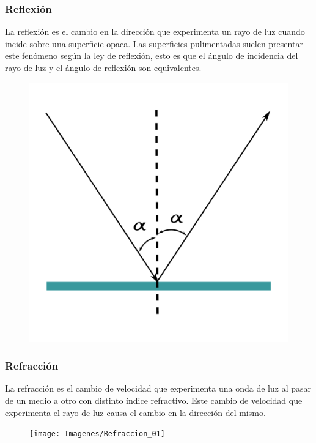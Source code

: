\documentclass[10pt,a4paper]{article}
\begin{document}
\subsubsection{Reflexión}
La reflexión es el cambio en la dirección que experimenta un rayo de luz cuando incide sobre una superficie opaca. Las superficies pulimentadas suelen presentar este fenómeno según la ley de reflexión, esto es que el ángulo de incidencia del rayo de luz y el ángulo de reflexión son equivalentes.
\begin{figure}[H]
\centering
\includegraphics[scale=0.18]{Imagenes/Reflexion_01}
\end{figure}

\subsubsection{Refracción}
La refracción es el cambio de velocidad que experimenta una onda de luz al pasar de un medio a otro con distinto índice refractivo. Este cambio de velocidad que experimenta el rayo de luz causa el cambio en la dirección del mismo.
\begin{figure}[H]
\centering
\texttt{[image: Imagenes/Refraccion\_01]}
\end{figure}
\end{document}
